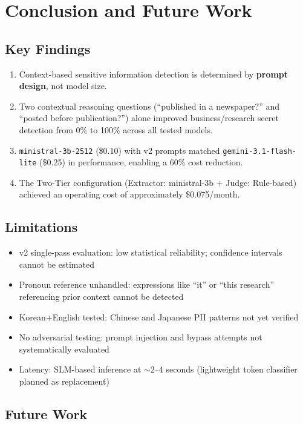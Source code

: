 \documentclass[11pt,a4paper]{article}
\begin{document}
\section{Conclusion and Future Work}

\subsection{Key Findings}

\begin{enumerate}[nosep]
  \item Context-based sensitive information detection is determined by \textbf{prompt design}, not model size.
  \item Two contextual reasoning questions (``published in a newspaper?'' and ``posted before publication?'') alone improved business/research secret detection from 0\% to 100\% across all tested models.
  \item \texttt{ministral-3b-2512} (\$0.10) with v2 prompts matched \texttt{gemini-3.1-flash-lite} (\$0.25) in performance, enabling a 60\% cost reduction.
  \item The Two-Tier configuration (Extractor: ministral-3b + Judge: Rule-based) achieved an operating cost of approximately \$0.075/month.
\end{enumerate}

\subsection{Limitations}

\begin{itemize}[nosep]
  \item v2 single-pass evaluation: low statistical reliability; confidence intervals cannot be estimated
  \item Pronoun reference unhandled: expressions like ``it'' or ``this research'' referencing prior context cannot be detected
  \item Korean+English tested: Chinese and Japanese PII patterns not yet verified
  \item No adversarial testing: prompt injection and bypass attempts not systematically evaluated
  \item Latency: SLM-based inference at $\sim$2--4 seconds (lightweight token classifier planned as replacement)
\end{itemize}

\subsection{Future Work}
\end{document}
